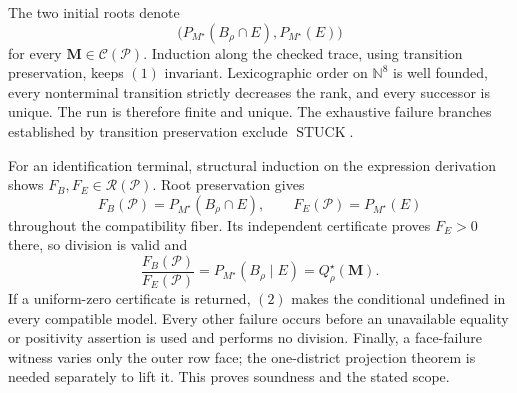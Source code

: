 The two initial roots denote
\[
\bigl(P_{M^\star}(B_\rho\cap E),P_{M^\star}(E)\bigr)
\tag{1}
\]
for every \(\mathbf M\in\mathcal C(\mathcal P)\).  Induction along the checked trace, using transition preservation, keeps \((1)\) invariant.  Lexicographic order on \(\mathbb N^8\) is well founded, every nonterminal transition strictly decreases the rank, and every successor is unique.  The run is therefore finite and unique.  The exhaustive failure branches established by transition preservation exclude \(\operatorname{STUCK}\).

For an identification terminal, structural induction on the expression derivation shows \(F_B,F_E\in\mathscr R(\mathcal P)\).  Root preservation gives
\[
F_B(\mathcal P)=P_{M^\star}(B_\rho\cap E),
\qquad
F_E(\mathcal P)=P_{M^\star}(E)
\tag{2}
\]
throughout the compatibility fiber.  Its independent certificate proves \(F_E>0\) there, so division is valid and
\[
\frac{F_B(\mathcal P)}{F_E(\mathcal P)}
=P_{M^\star}(B_\rho\mid E)=Q_\rho^\star(\mathbf M).
\tag{3}
\]
If a uniform-zero certificate is returned, \((2)\) makes the conditional undefined in every compatible model.  Every other failure occurs before an unavailable equality or positivity assertion is used and performs no division.  Finally, a face-failure witness varies only the outer row face; the one-district projection theorem is needed separately to lift it.  This proves soundness and the stated scope.